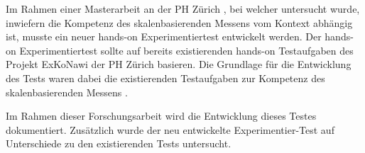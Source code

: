 
Im Rahmen einer Masterarbeit an der PH Zürich \citep{Sichau2015a}, bei welcher untersucht wurde, inwiefern die Kompetenz des skalenbasierenden Messens vom Kontext abhängig ist, musste ein neuer hands-on Experimentiertest entwickelt werden. Der hands-on Experimentiertest sollte auf bereits existierenden hands-on Testaufgaben des Projekt ExKoNawi der PH Zürich \citep{Metzger2013} basieren. Die Grundlage für die Entwicklung des Tests waren dabei die existierenden Testaufgaben zur Kompetenz des skalenbasierenden Messens \citep{Gut2013a, Metzger2013}.


Im Rahmen dieser Forschungsarbeit wird die Entwicklung dieses Testes dokumentiert. Zusätzlich wurde der neu entwickelte Experimentier-Test auf Unterschiede zu den existierenden Tests untersucht.




